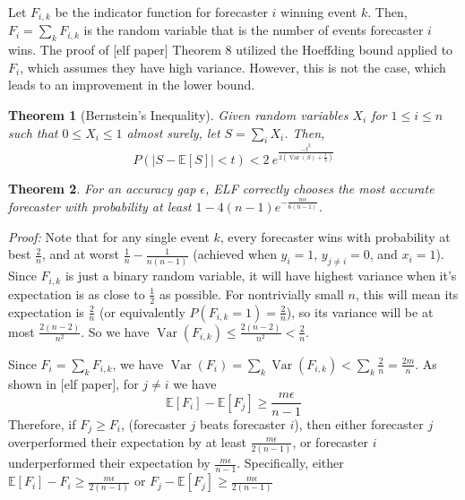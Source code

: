 \documentclass[letterpaper,12pt]{article}
\DeclareMathOperator*{\Var}{Var}
\newcommand{\E}{\mathbb{E}}
\newcommand{\1}{\mathbbm{1}}
\newtheorem{theorem}{Theorem}
\begin{document}
Let $F_{i, k}$ be the indicator function for forecaster $i$ winning event $k$. Then, $F_i = \sum_k F_{i, k}$ is the random variable that is the number of events forecaster $i$ wins. The proof of [elf paper] Theorem 8 utilized the Hoeffding bound applied to $F_i$, which assumes they have high variance. However, this is not the case, which leads to an improvement in the lower bound. 
\begin{theorem}[Bernstein's Inequality]
  \label{bernstein}
  Given random variables $X_i$ for $1 \leq i \leq n$ such that $0 \leq X_i \leq 1$ almost surely, let $S = \sum_i X_i$. Then,
  \[ P\left(|S - \E[S]| < t\right) < 2 \: e^{\frac{-t^2 }{2\left(\Var(S) + \frac{t}{3}\right)} } \]
\end{theorem}
\begin{theorem}
  \label{elf_bound}
    For an accuracy gap $\epsilon$, ELF correctly chooses the most accurate forecaster with probability at least $1 - 4 (n-1) e^{-\frac{m \epsilon}{6(n - 1)}}$.
\end{theorem}
\emph{Proof:} Note that for any single event $k$, every forecaster wins with probability at best $\frac{2}{n}$, and at worst $\frac{1}{n} - \frac{1}{n(n-1)}$ (achieved when $y_i = 1$, $y_{j\neq i} = 0$, and $x_i = 1$). Since $F_{i, k}$ is just a binary random variable, it will have highest variance when it's expectation is as close to $\frac{1}{2}$ as possible. For nontrivially small $n$, this will mean its expectation is $\frac{2}{n}$ (or equivalently $P(F_{i, k} = 1) = \frac{2}{n}$), so its variance will be at most $\frac{2(n-2)}{n^2}$. So we have $\Var(F_{i, k}) \leq \frac{2(n-2)}{n^2} < \frac{2}{n}$. 

Since $F_i = \sum_k F_{i, k}$, we have $\Var(F_i) = \sum_k \Var(F_{i, k}) < \sum_k \frac{2}{n} = \frac{2m}{n}$. As shown in [elf paper], for $j\neq i$ we have 
\[ \E[F_i] - \E[F_j] \geq \frac{m \epsilon}{n - 1}\]
Therefore, if $F_j \geq F_i$, (forecaster $j$ beats forecaster $i$), then either forecaster $j$ overperformed their expectation by at least $\frac{m \epsilon}{2(n - 1)}$, or forecaster $i$ underperformed their expectation by $\frac{m \epsilon}{n - 1}$. Specifically, either $\E[F_i] - F_i \geq \frac{m \epsilon}{2(n - 1)}$ or $F_j - \E[F_j] \geq \frac{m \epsilon}{2(n - 1)}$
\end{document}
